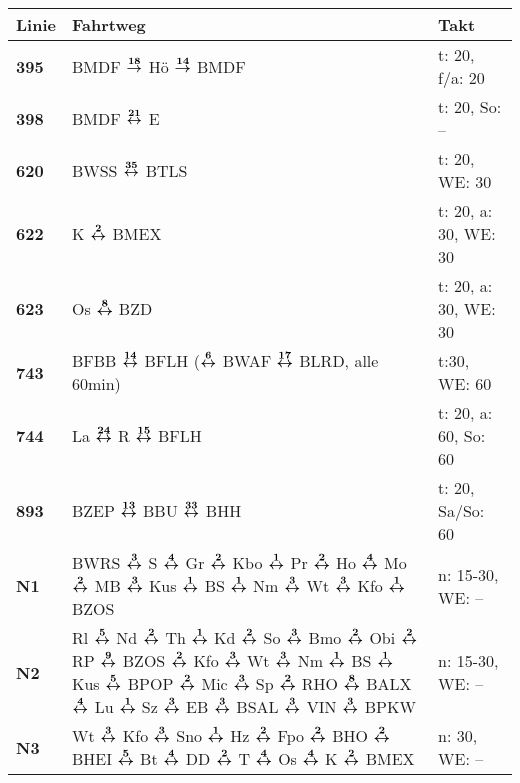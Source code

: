 \begin{minipage}[t]{0.45\textwidth}
\begin{tabular}{>{\bfseries}L{1.2cm}L{9.0cm}L{3.0cm}}
{\bfseries Linie} & {\bfseries Fahrtweg} & {\bfseries Takt} \\
\hline
\bus{} 395    & BMDF $\xarre{18}$ Hö $\xarre{14}$ BMDF                                                                                                                              & t: 20, f/a: 20             \\
\bus{} 398    & BMDF $\xarwe{21}$ E
& t: 20, So: --              \\
\bus{} 620    & BWSS $\xarwe{35}$ BTLS   & t: 20, WE: 30 \\
\bus{} 622    & K $\xarwe{2}$ BMEX       & t: 20, a: 30, WE: 30 \\
\bus{} 623    & Os $\xarwe{8}$ BZD       & t: 20, a: 30, WE: 30 \\
\bus{} 743    & BFBB $\xarwe{14}$ BFLH ($\xarwe{6}$ BWAF $\xarwe{17}$ BLRD, alle 60min) & t:30, WE: 60 \\
\bus{} 744    & La $\xarwe{24}$ R $\xarwe{15}$ BFLH & t: 20, a: 60, So: 60 \\
\bus{} 893    & BZEP $\xarwe{13}$ BBU $\xarwe{33}$ BHH                                                                                                                              & t: 20, Sa/So: 60           \\
\nbus{} N1    & BWRS $\xarwe{3}$ S $\xarwe{4}$ Gr $\xarwe{2}$ Kbo $\xarwe{1}$ Pr $\xarwe{2}$ Ho $\xarwe{4}$ Mo $\xarwe{2}$ MB $\xarwe{3}$ Kus $\xarwe{1}$ BS $\xarwe{1}$ Nm         %
                $\xarwe{3}$ Wt $\xarwe{3}$ Kfo $\xarwe{1}$ BZOS                                                                                                                     & n: 15-30, WE: --           \\
\nbus{} N2    & Rl $\xarwe{5}$ Nd $\xarwe{2}$ Th $\xarwe{1}$ Kd $\xarwe{2}$ So $\xarwe{3}$ Bmo $\xarwe{2}$ Obi $\xarwe{2}$ RP $\xarwe{9}$ BZOS $\xarwe{2}$ Kfo $\xarwe{3}$ Wt       %
                $\xarwe{3}$ Nm $\xarwe{1}$ BS $\xarwe{1}$ Kus $\xarwe{5}$ BPOP $\xarwe{2}$ Mic $\xarwe{3}$ Sp $\xarwe{2}$ RHO $\xarwe{8}$ BALX $\xarwe{4}$ Lu%
                $\xarwe{1}$ Sz $\xarwe{3}$ EB $\xarwe{3}$ BSAL $\xarwe{3}$ VIN $\xarwe{3}$ BPKW                                                                                     & n: 15-30, WE: --           \\
\nbus{} N3    & Wt $\xarwe{3}$ Kfo $\xarwe{3}$ Sno $\xarwe{1}$ Hz $\xarwe{2}$ Fpo $\xarwe{2}$ BHO $\xarwe{2}$ BHEI $\xarwe{5}$ Bt $\xarwe{4}$ DD $\xarwe{2}$ T $\xarwe{4}$ Os       %
                $\xarwe{4}$ K $\xarwe{2}$ BMEX                                                                                                                                      & n: 30, WE: --              \\
\hline
\end{tabular}
\end{minipage}
\begin{minipage}[t]{0.05\textwidth}
\phantom{Tor}
\end{minipage}


